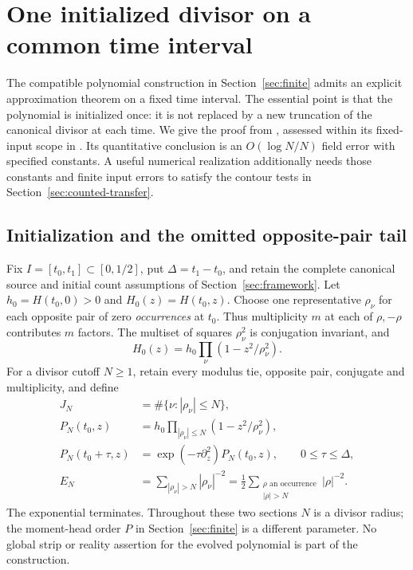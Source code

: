 \section{One initialized divisor on a common time interval}
\label{sec:common-time}

The compatible polynomial construction in Section~\ref{sec:finite}
admits an explicit approximation theorem on a fixed time interval.
The essential point is that the polynomial is initialized once: it is
not replaced by a new truncation of the canonical divisor at each time.
We give the proof from \cite{BakerCM47}, assessed within its fixed-input
scope in \cite{BakerCMReview40}. Its quantitative conclusion is an
$O(\log N/N)$ field error with specified constants. A useful numerical
realization additionally needs those constants and finite input errors
to satisfy the contour tests in Section~\ref{sec:counted-transfer}.

\subsection{Initialization and the omitted opposite-pair tail}

Fix $I=[t_0,t_1]\subset[0,1/2]$, put $\Delta=t_1-t_0$, and retain
the complete canonical source and initial count assumptions of
Section~\ref{sec:framework}. Let $h_0=H(t_0,0)>0$ and
$H_0(z)=H(t_0,z)$. Choose one representative $\rho_\nu$ for each
opposite pair of zero \emph{occurrences} at $t_0$. Thus multiplicity
$m$ at each of $\rho,-\rho$ contributes $m$ factors. The multiset of
squares $\rho_\nu^2$ is conjugation invariant, and
\begin{equation}
 H_0(z)=h_0\prod_\nu(1-z^2/\rho_\nu^2).
 \label{cta:initial-product}
\end{equation}
For a divisor cutoff $N\ge1$, retain every modulus tie, opposite pair,
conjugate and multiplicity, and define
\begin{equation}
 \begin{split}
 J_N&=\#\{\nu:|\rho_\nu|\le N\},\\
 P_N(t_0,z)&=h_0\prod_{|\rho_\nu|\le N}(1-z^2/\rho_\nu^2),\\
 P_N(t_0+\tau,z)&=\exp(-\tau\partial_z^2)P_N(t_0,z),
       \qquad 0\le\tau\le\Delta,\\
 E_N&=\sum_{|\rho_\nu|>N}|\rho_\nu|^{-2}
     =\frac12\sum_{\substack{\rho\text{ an occurrence}\\|\rho|>N}}
                    |\rho|^{-2}.
 \end{split}
 \label{cta:initialization}
\end{equation}
The exponential terminates. Throughout these two sections $N$ is a
divisor radius; the moment-head order $P$ in Section~\ref{sec:finite}
is a different parameter. No global strip or reality assertion for
the evolved polynomial is part of the construction.

